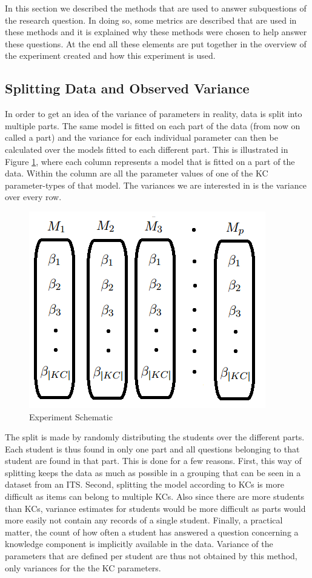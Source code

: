 \documentclass{scrartcl}
\begin{document}
In this section we described the methods that are used to answer subquestions of the research question. In doing so, some metrics are described that are used in these methods and it is explained why these methods were chosen to help answer these questions. At the end all these elements are put together in the overview of the experiment created and how this experiment is used.

\subsection{Splitting Data and Observed Variance}
\label{sec:splits}
In order to get an idea of the variance of parameters in reality, data is split into multiple parts. The same model is fitted on each part of the data (from now on called a part) and the variance for each individual parameter can then be calculated over the models fitted to each different part. This is illustrated in Figure \ref{fig:explain}, where each column represents a model that is fitted on a part of the data. Within the column are all the parameter values of one of the KC parameter-types of that model. The variances we are interested in is the variance over every row.

\begin{figure}
\begin{center}
\includegraphics[width=.42\textwidth]{images/uitleg.png}
\end{center}
\caption{Experiment Schematic}
\label{fig:explain}
\end{figure}

The split is made by randomly distributing the students over the different parts. Each student is thus found in only one part and all questions belonging to that student are found in that part. This is done for a few reasons. First, this way of splitting keeps the data as much as possible in a grouping that can be seen in a dataset from an ITS.  Second, splitting the model according to KCs is more difficult as items can belong to multiple KCs. Also since there are more students than KCs, variance estimates for students would be more difficult as parts would more easily not contain any records of a single student. Finally, a practical matter, the count of how often a student has answered a question concerning a knowledge component is implicitly available in the data. Variance of the parameters that are defined per student are thus not obtained by this method, only variances for the the KC parameters.
\end{document}
